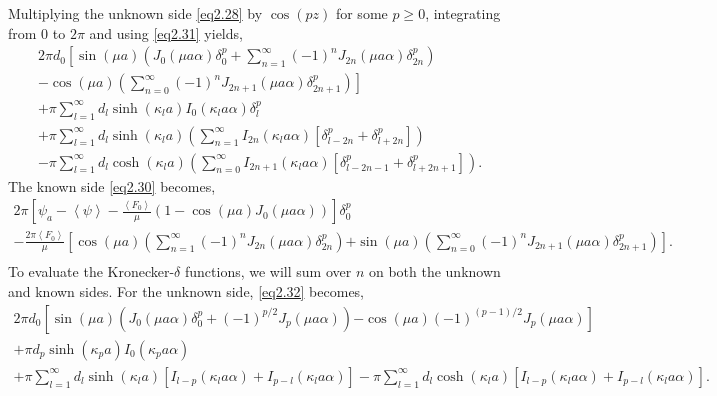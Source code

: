\documentclass[aip,graphicx]{revtex4-1}
\newcommand{\lr}[1]{\left(#1\right)}
\newcommand{\lrsq}[1]{\left[ #1 \right]}
\newcommand{\lra}[1]{\left\langle #1 \right\rangle}
\newcommand{\besj}[2]{J_{#1}\lr{#2}}
\newcommand{\besi}[2]{I_{#1}\lr{#2}}
\begin{document}
Multiplying the unknown side \eqref{eq2.28} by $\cos\lr{p z}$ for some $p\geq 0$, integrating from $0$ to $2\pi$ and using \eqref{eq2.31} yields,
    \begin{multline}
        2\pi d_0\left[\sin\lr{\mu a}\lr{\besj{0}{\mu a \alpha}\delta_{0}^{p}+\sum_{n=1}^{\infty}\lr{-1}^n\besj{2n}{\mu a \alpha}\delta_{2n}^{p}}\right.\\
        \left.-\cos\lr{\mu a}\lr{\sum_{n=0}^{\infty}\lr{-1}^n\besj{2n+1}{\mu a \alpha}\delta_{2n+1}^{p}}\right]\\
        +\pi\sum_{l=1}^{\infty}d_l\sinh\lr{\kappa_l a}\besi{0}{\kappa_l a \alpha}\delta_{l}^{p}\\
        +\pi\sum_{l=1}^{\infty}d_l\sinh\lr{\kappa_l a}\lr{  
        \sum_{n=1}^{\infty}\besi{2n}{\kappa_l a \alpha}\lrsq{\delta_{l-2n}^{p}+\delta_{l+2n}^{p}}}\\
        -\pi\sum_{l=1}^{\infty}d_l\cosh\lr{\kappa_l a}\lr{\sum_{n=0}^{\infty}\besi{2n+1}{\kappa_l a \alpha}\lrsq{\delta_{l-2n-1}^{p}+\delta_{l+2n+1}^{p}}}.\label{eq2.32}    
    \end{multline}
The known side \eqref{eq2.30} becomes,
        \begin{multline}
        2\pi\lrsq{\psi_a-\lra{\psi}-\frac{\lra{F_0}}{\mu}\lr{1-\cos\lr{\mu a}\besj{0}{\mu a \alpha}}}\delta_{0}^{p}\\
        -\frac{2\pi\lra{F_0}}{\mu}\left[\cos\lr{\mu a}\lr{\sum_{n=1}^{\infty}\lr{-1}^n\besj{2n}{\mu a \alpha}\delta_{2n}^{p}}\right.
        \left.+\sin\lr{\mu a}\lr{\sum_{n=0}^{\infty}\lr{-1}^n\besj{2n+1}{\mu a \alpha}\delta_{2n+1}^{p}}\right].\label{eq2.33}\\    
        \end{multline}
To evaluate the Kronecker-$\delta$ functions, we will sum over $n$ on both the unknown and known sides. For the unknown side, \eqref{eq2.32} becomes,
    \begin{multline}
        2\pi d_0\left[\sin\lr{\mu a}\lr{\besj{0}{\mu a \alpha}\delta_{0}^{p}+\lr{-1}^{p/2}\besj{p}{\mu a \alpha}}\right.\left.-\cos\lr{\mu a}\lr{-1}^{(p-1)/2}\besj{p}{\mu a \alpha}\right]\\
        +\pi d_p\sinh\lr{\kappa_p a}\besi{0}{\kappa_p a \alpha}\\
        +\pi\sum_{l=1}^{\infty}d_l\sinh\lr{\kappa_l a}  
        \lrsq{\besi{l-p}{\kappa_l a \alpha}+\besi{p-l}{\kappa_l a \alpha}}-\pi\sum_{l=1}^{\infty}d_l\cosh\lr{\kappa_l a}\lrsq{\besi{l-p}{\kappa_l a \alpha}+\besi{p-l}{\kappa_l a \alpha}}.\label{eq2.34}    
    \end{multline}
\end{document}
